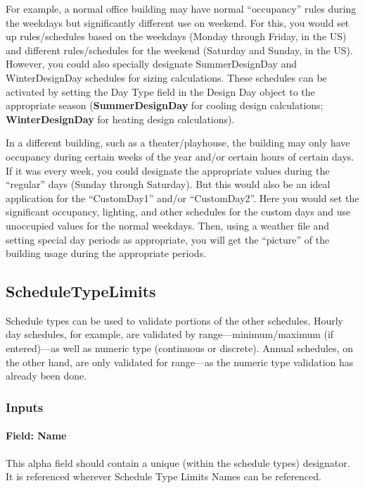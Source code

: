 For example, a normal office building may have normal ``occupancy'' rules during the weekdays but significantly different use on weekend. For this, you would set up rules/schedules based on the weekdays (Monday through Friday, in the US) and different rules/schedules for the weekend (Saturday and Sunday, in the US). However, you could also specially designate SummerDesignDay and WinterDesignDay schedules for sizing calculations. These schedules can be activated by setting the Day Type field in the Design Day object to the appropriate season (\textbf{SummerDesignDay} for cooling design calculations; \textbf{WinterDesignDay} for heating design calculations).

In a different building, such as a theater/playhouse, the building may only have occupancy during certain weeks of the year and/or certain hours of certain days. If it was every week, you could designate the appropriate values during the ``regular'' days (Sunday through Saturday). But this would also be an ideal application for the ``CustomDay1'' and/or ``CustomDay2''. Here you would set the significant occupancy, lighting, and other schedules for the custom days and use unoccupied values for the normal weekdays. Then, using a weather file and setting special day periods as appropriate, you will get the ``picture'' of the building usage during the appropriate periods.

\subsection{ScheduleTypeLimits}\label{scheduletypelimits}

Schedule types can be used to validate portions of the other schedules. Hourly day schedules, for example, are validated by range---minimum/maximum (if entered)---as well as numeric type (continuous or discrete). Annual schedules, on the other hand, are only validated for range---as the numeric type validation has already been done.

\subsubsection{Inputs}\label{inputs-042}

\paragraph{Field: Name}\label{field-name-041}

This alpha field should contain a unique (within the schedule types) designator. It is referenced wherever Schedule Type Limits Names can be referenced.

